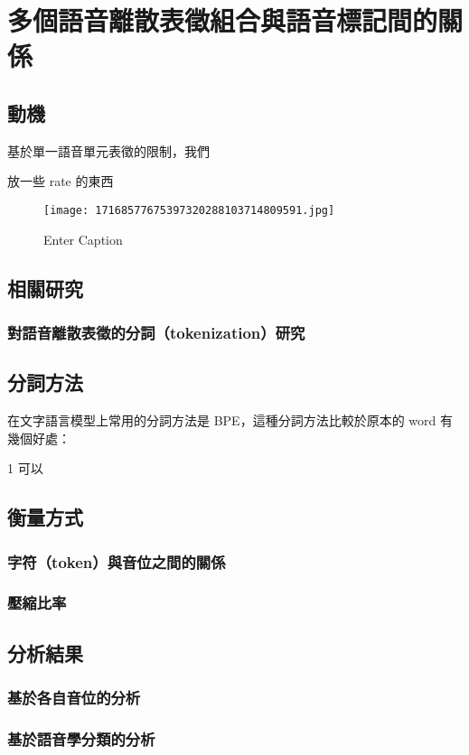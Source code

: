 \chapter{多個語音離散表徵組合與語音標記間的關係}
\section{動機}

基於單一語音單元表徵的限制，我們

放一些 rate 的東西
\begin{figure}
    \centering
    \texttt{[image: 17168577675397320288103714809591.jpg]}
    \caption{Enter Caption}
    \label{fig:enter-label}
\end{figure}


\section{相關研究}
\subsection{對語音離散表徵的分詞（tokenization）研究}
\section{分詞方法}

在文字語言模型上常用的分詞方法是 BPE，這種分詞方法比較於原本的 word 有幾個好處：

1 可以


\section{衡量方式}
\subsection{字符（token）與音位之間的關係}
\subsection{壓縮比率}
\section{分析結果}
\subsection{基於各自音位的分析}
\subsection{基於語音學分類的分析}\newpage
